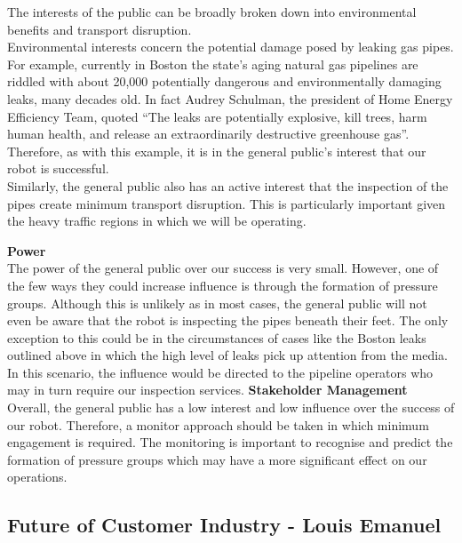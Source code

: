 \documentclass[11pt]{article}		%
\begin{document}
        The interests of the public can be broadly broken down into environmental benefits and transport disruption.\\
	    \hspace*{3ex}Environmental interests concern the potential damage posed by leaking gas pipes. For example, currently in Boston the state’s aging natural gas pipelines are riddled with about 20,000 potentially dangerous and environmentally damaging leaks, many decades old. In fact Audrey Schulman, the president of Home Energy Efficiency Team, quoted  “The leaks are potentially explosive, kill trees, harm human health, and release an extraordinarily destructive greenhouse gas”. Therefore, as with this example, it is in the general public's interest that our robot is successful. \\
        \hspace*{3ex}Similarly, the general public also has an active interest that the inspection of the pipes create minimum transport disruption. This is particularly important given the heavy traffic regions in which we will be operating. 
        
        \textbf{Power}\\
        The power of the general public over our success is very small. However, one of the few ways they could increase influence is through the formation of pressure groups. Although this is unlikely as in most cases, the general public will not even be aware that the robot is inspecting the pipes beneath their feet. The only exception to this could be in the circumstances of cases like the Boston leaks outlined above in which the high level of leaks pick up attention from the media. In this scenario, the influence would be directed to the pipeline operators who may in turn require our inspection services.
        \textbf{Stakeholder Management}\\
        
        Overall, the general public has a low interest and low influence over the success of our robot. Therefore, a monitor approach should be taken in which minimum engagement is required. The monitoring is important to recognise and predict the formation of pressure groups which may have a more significant effect on our operations. 

        
		\subsection[Future of Customer Industry]{Future of Customer Industry - Louis Emanuel}
		
\end{document}

